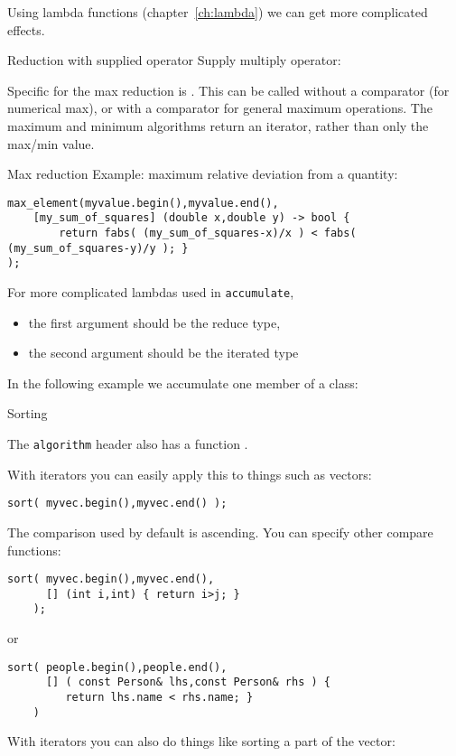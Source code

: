 Using lambda functions (chapter~\ref{ch:lambda})
we can get more complicated effects.

\begin{block}{Reduction with supplied operator}
  \label{sl:vec-multiplies}
  Supply multiply operator:
\end{block}

Specific for the max reduction is .
This can be called without a comparator (for numerical max),
or with a comparator for general maximum operations.
The maximum and minimum algorithms return an iterator,
rather than only the max/min value.

\begin{block}{Max reduction}
  Example: maximum relative deviation from a quantity:
\begin{lstlisting}
max_element(myvalue.begin(),myvalue.end(),
    [my_sum_of_squares] (double x,double y) -> bool {
        return fabs( (my_sum_of_squares-x)/x ) < fabs( (my_sum_of_squares-y)/y ); }
);
\end{lstlisting}
\end{block}

For more complicated lambdas used in \lstinline{accumulate},
\begin{itemize}
\item the first argument should be the reduce type,
\item the second argument should be the iterated type
\end{itemize}
In the following example we accumulate one member
of a class:
\begin{multicols}{2}
  \columnbreak
\end{multicols}

 {Sorting}
\label{sec:stl:sort}

The \lstinline{algorithm} header also has a function .

With iterators you can easily apply this to things such as vectors:
\begin{lstlisting}
sort( myvec.begin(),myvec.end() );
\end{lstlisting}
The comparison used by default is ascending.
You can specify other compare functions:
\begin{lstlisting}
sort( myvec.begin(),myvec.end(),
      [] (int i,int) { return i>j; }
    );
\end{lstlisting}
or
\begin{lstlisting}
sort( people.begin(),people.end(),
      [] ( const Person& lhs,const Person& rhs ) {
         return lhs.name < rhs.name; }
    )
\end{lstlisting}
With iterators you can also do things like sorting a part of the vector:

